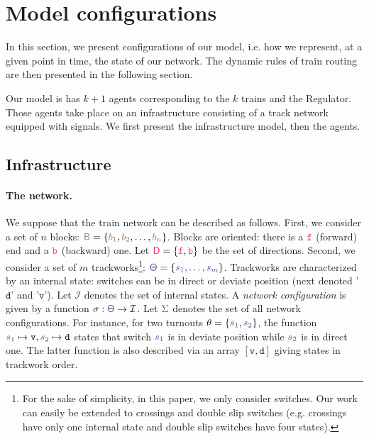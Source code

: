 \documentclass[runningheads]{llncs}
\newcommand{\directions}{\dirFmt{\mathsf{D}}}
\newcommand{\internalState}{{\mathcal{I}}}
\newcommand{\forward}{\ensuremath{\mathtt{f}}}
\newcommand{\backward}{\ensuremath{\mathtt{b}}\xspace}
\newcommand{\dirFmt}[1]{{\color{dircolor} #1}}
\newcommand{\dirForward}{\ensuremath{\dirFmt{\forward}}\xspace}
\newcommand{\dirBackward}{\ensuremath{\dirFmt{\backward}}\xspace}
\newcommand{\posFmt}[1]{{\color{poscolor}{#1}}}
\newcommand{\blocks}{{\posFmt{\mathsf{B}}}}
\newcommand{\bid}[1]{\ensuremath{\posFmt{b_{#1}}}}
\newcommand{\swFmt}[1]{{\color{swcolor}{#1}}}
\newcommand{\sid}[1]{\ensuremath{\swFmt{s_{#1}}}}
\newcommand{\turnouts}{\swFmt{\mathsf{\Theta}}}
\newcommand{\networkConf}{\ensuremath{\swFmt{\Sigma}}}
\newcommand{\deviate}{{\mbox{$\mathtt{v}$}}\xspace}
\newcommand{\direct}{{\mbox{$\mathtt{d}$}}\xspace}
\begin{document}
\section{Model configurations}
\label{sec:model_configurations}

In this section, we present configurations of our model, i.e. how we represent, at a given point in time, the state of our network. The dynamic rules of train routing are then presented in the following section.

Our model is has $k+1$ agents corresponding to the $k$ trains and the Regulator. Those agents take place on an infrastructure consisting of a track network equipped with signals. We first present the infrastructure model, then the agents.

\subsection{Infrastructure}

\paragraph{The network.} 

We suppose that the train network can be described as follows. First, we consider a set of $n$ blocks: $\blocks = \{ \bid{1}, \bid{2}, \ldots, \bid{n}\}$. Blocks are oriented: there is a $\dirForward$ (forward) end and a $\dirBackward$ (backward) one. Let $\directions = \{\dirForward, \dirBackward\}$ be the set of directions.  Second, we consider a set of $m$ trackworks\footnote{For the sake of simplicity, in this paper, we only consider switches. Our work can easily be extended to crossings and double slip switches (e.g. crossings have only one internal state and double slip switches have four states).}: $\turnouts = \{\sid{1}, \ldots, \sid{m}\}$. Trackworks are characterized by an internal state: switches can be in direct or deviate position (next denoted '\direct' and '\deviate'). Let $\internalState$ denotes the set of internal states. A \emph{network configuration} is given by a function $\sigma: \turnouts \to \internalState$. Let $\networkConf$ denotes the set of all network configurations. For instance, for two turnouts $\theta = \{\sid{1}, \sid{2}\}$, the function $\sid{1} \mapsto \deviate, \sid{2} \mapsto \direct$ states that switch $\sid{1}$ is in deviate position while \sid{2} is in direct one. The latter function is also described via an array  $[\deviate, \direct]$ giving states in trackwork order.
\end{document}
